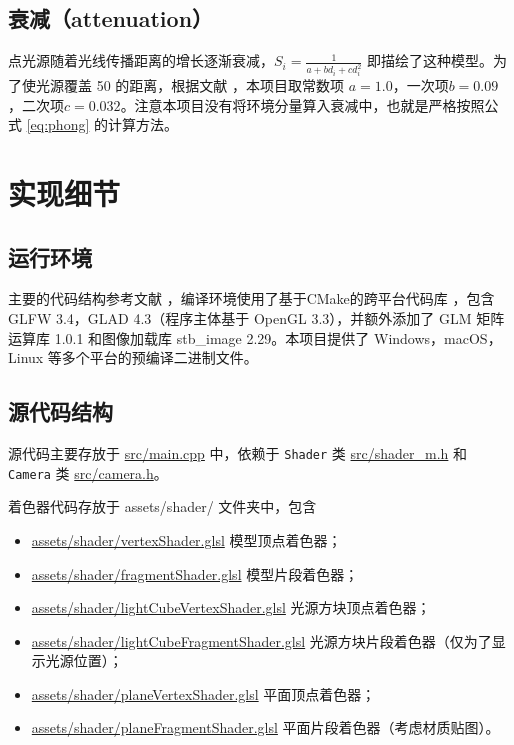 \documentclass[math-font=newcm]{sjtuarticle}
\providecommand{\linkcode}[1]{\href{run:../source/#1}{#1}}
\begin{document}
\subsection{衰减（attenuation）}
点光源随着光线传播距离的增长逐渐衰减，$S_i=\frac{1}{a+bd_i+cd_i^2}$ 即描绘了这种模型。为了使光源覆盖 50 的距离，根据文献 \parencite{light}，本项目取常数项 $a=1.0$，一次项$b=0.09$，二次项$c=0.032$。注意本项目没有将环境分量算入衰减中，也就是严格按照公式 \eqref{eq:phong} 的计算方法。

\section{实现细节}

\subsection{运行环境}

主要的代码结构参考文献 \parencite{learnopengl}，编译环境使用了基于CMake的跨平台代码库 \parencite{simpleopengl}，包含 GLFW 3.4，GLAD 4.3（程序主体基于 OpenGL 3.3），并额外添加了 GLM 矩阵运算库 1.0.1 \cite{glm} 和图像加载库 stb\_image 2.29\cite{stb}。本项目提供了 Windows，macOS，Linux 等多个平台的预编译二进制文件。

\subsection{源代码结构}

源代码主要存放于 \href{run:../source/src/main.cpp}{src/main.cpp} 中，依赖于 \verb"Shader" 类\cite{shader} \href{run:../source/src/shader_m.h}{src/shader\_m.h} 和 \verb"Camera" 类\cite{camera} \href{run:../source/src/camera.h}{src/camera.h}。

着色器代码存放于 assets/shader/ 文件夹中，包含
\begin{itemize}
    \item \linkcode{assets/shader/vertexShader.glsl} 模型顶点着色器；
    \item \linkcode{assets/shader/fragmentShader.glsl} 模型片段着色器；
    \item \linkcode{assets/shader/lightCubeVertexShader.glsl} 光源方块顶点着色器；
    \item \linkcode{assets/shader/lightCubeFragmentShader.glsl} 光源方块片段着色器（仅为了显示光源位置）；
    \item \linkcode{assets/shader/planeVertexShader.glsl} 平面顶点着色器；
    \item \linkcode{assets/shader/planeFragmentShader.glsl} 平面片段着色器（考虑材质贴图）。
\end{itemize}
\end{document}
